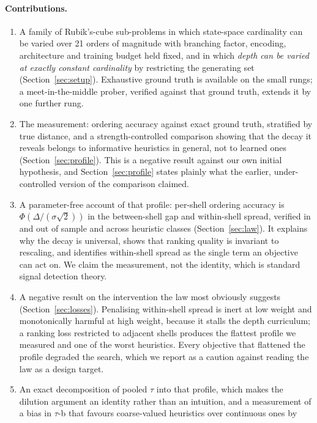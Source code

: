 \documentclass{article}
\begin{document}
\paragraph{Contributions.}
\begin{enumerate}\itemsep2pt
\item A family of Rubik's-cube sub-problems in which state-space cardinality can
be varied over 21 orders of magnitude with branching factor, encoding,
architecture and training budget held fixed, and in which \emph{depth can be
varied at exactly constant cardinality} by restricting the generating set
(Section~\ref{sec:setup}). Exhaustive ground truth is available on the small
rungs; a meet-in-the-middle prober, verified against that ground truth, extends
it by one further rung.
\item The measurement: ordering accuracy against exact ground truth, stratified
by true distance, and a strength-controlled comparison showing that the decay
it reveals belongs to informative heuristics in general, not to learned ones
(Section~\ref{sec:profile}). This is a negative result against our own initial
hypothesis, and Section~\ref{sec:profile} states plainly what the earlier,
under-controlled version of the comparison claimed.
\item A parameter-free account of that profile: per-shell ordering accuracy is
$\Phi(\Delta/(\sigma\sqrt{2}))$ in the between-shell gap and within-shell spread,
verified in and out of sample and across heuristic classes
(Section~\ref{sec:law}). It explains why the decay is universal, shows that
ranking quality is invariant to rescaling, and identifies within-shell spread as
the single term an objective can act on. We claim the measurement, not the
identity, which is standard signal detection theory.
\item A negative result on the intervention the law most obviously suggests
(Section~\ref{sec:losses}). Penalising within-shell spread is inert at low weight
and monotonically harmful at high weight, because it stalls the depth curriculum;
a ranking loss restricted to adjacent shells produces the flattest profile we
measured and one of the worst heuristics. Every objective that flattened the
profile degraded the search, which we report as a caution against reading the law
as a design target.
\item An exact decomposition of pooled $\tau$ into that profile, which makes the
dilution argument an identity rather than an intuition, and a measurement of a
bias in $\tau$-b that favours coarse-valued heuristics over continuous ones by

\end{enumerate}
\end{document}
